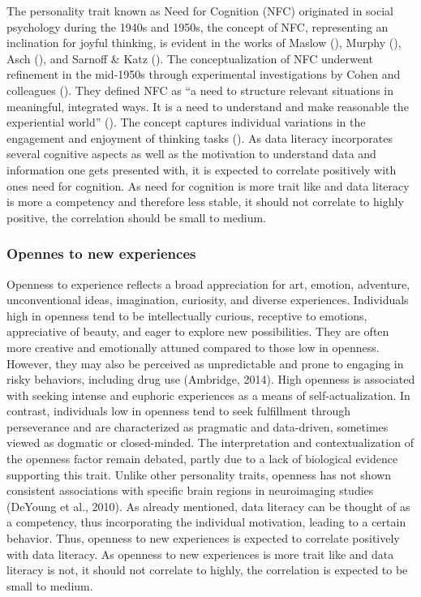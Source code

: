 \documentclass[
  12pt,
  a4paper,
  twoside]{article}
\begin{document}
The personality trait known as Need for Cognition (NFC) originated in social psychology during the 1940s and 1950s, the concept of NFC, representing an inclination for joyful thinking, is evident in the works of Maslow (), Murphy (), Asch (), and Sarnoff \& Katz (). The conceptualization of NFC underwent refinement in the mid-1950s through experimental investigations by Cohen and colleagues (). They defined NFC as ``a need to structure relevant situations in meaningful, integrated ways. It is a need to understand and make reasonable the experiential world'' (). The concept captures individual variations in the engagement and enjoyment of thinking tasks (). As data literacy incorporates several cognitive aspects as well as the motivation to understand data and information one gets presented with, it is expected to correlate positively with ones need for cognition. As need for cognition is more trait like and data literacy is more a competency and therefore less stable, it should not correlate to highly positive, the correlation should be small to medium.

\subsubsection{Opennes to new experiences}\label{opennes-to-new-experiences}

Openness to experience reflects a broad appreciation for art, emotion, adventure, unconventional ideas, imagination, curiosity, and diverse experiences. Individuals high in openness tend to be intellectually curious, receptive to emotions, appreciative of beauty, and eager to explore new possibilities. They are often more creative and emotionally attuned compared to those low in openness. However, they may also be perceived as unpredictable and prone to engaging in risky behaviors, including drug use (Ambridge, 2014). High openness is associated with seeking intense and euphoric experiences as a means of self-actualization. In contrast, individuals low in openness tend to seek fulfillment through perseverance and are characterized as pragmatic and data-driven, sometimes viewed as dogmatic or closed-minded. The interpretation and contextualization of the openness factor remain debated, partly due to a lack of biological evidence supporting this trait. Unlike other personality traits, openness has not shown consistent associations with specific brain regions in neuroimaging studies (DeYoung et al., 2010). As already mentioned, data literacy can be thought of as a competency, thus incorporating the individual motivation, leading to a certain behavior. Thus, openness to new experiences is expected to correlate positively with data literacy. As openness to new experiences is more trait like and data literacy is not, it should not correlate to highly, the correlation is expected to be small to medium.
\end{document}
